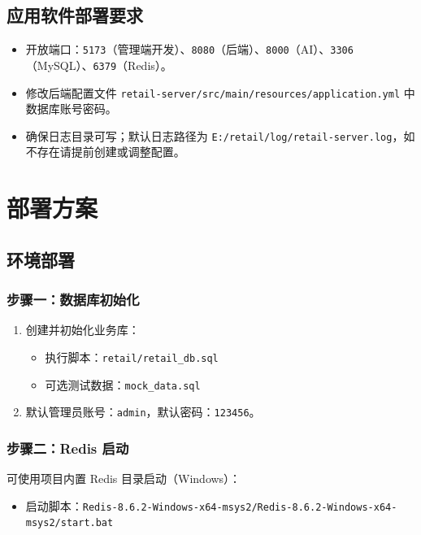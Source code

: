 \subsection{应用软件部署要求}
\begin{itemize}[leftmargin=2em]
  \item 开放端口：\texttt{5173}（管理端开发）、\texttt{8080}（后端）、\texttt{8000}（AI）、\texttt{3306}（MySQL）、\texttt{6379}（Redis）。
  \item 修改后端配置文件 \texttt{retail-server/src/main/resources/application.yml} 中数据库账号密码。
  \item 确保日志目录可写；默认日志路径为 \texttt{E:/retail/log/retail-server.log}，如不存在请提前创建或调整配置。
\end{itemize}

\section{部署方案}

\subsection{环境部署}

\subsubsection{步骤一：数据库初始化}
\begin{enumerate}[leftmargin=2em]
  \item 创建并初始化业务库：
  \begin{itemize}[leftmargin=2em]
    \item 执行脚本：\texttt{retail/retail\_db.sql}
    \item 可选测试数据：\texttt{mock\_data.sql}
  \end{itemize}
  \item 默认管理员账号：\texttt{admin}，默认密码：\texttt{123456}。
\end{enumerate}

\subsubsection{步骤二：Redis 启动}
可使用项目内置 Redis 目录启动（Windows）：
\begin{itemize}[leftmargin=2em]
  \item 启动脚本：\texttt{Redis-8.6.2-Windows-x64-msys2/Redis-8.6.2-Windows-x64-msys2/start.bat}
\end{itemize}

